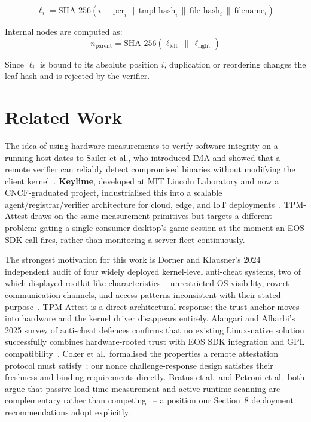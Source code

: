 \documentclass[11pt]{article}
\begin{document}
\begin{equation}
  \ell_i = \text{SHA-256}\!\left(i \,\|\, \text{pcr}_i \,\|\, \text{tmpl\_hash}_i \,\|\, \text{file\_hash}_i \,\|\, \text{filename}_i\right)
  \label{eq:leaf}
\end{equation}

Internal nodes are computed as:
\begin{equation}
  n_{\text{parent}} = \text{SHA-256}\!\left(\ell_{\text{left}} \,\|\, \ell_{\text{right}}\right)
  \label{eq:internal}
\end{equation}

Since $\ell_i$ is bound to its absolute position $i$, duplication or reordering changes the leaf hash and is rejected by the verifier.


\section{Related Work}
\label{sec:related-work}

The idea of using hardware measurements to verify software integrity on a running host dates to Sailer et al., who introduced IMA and showed that a remote verifier can reliably detect compromised binaries without modifying the client kernel~\cite{sailer2004ima}. \textbf{Keylime}, developed at MIT Lincoln Laboratory and now a CNCF-graduated project, industrialised this into a scalable agent/registrar/verifier architecture for cloud, edge, and IoT deployments~\cite{keylime}. TPM-Attest draws on the same measurement primitives but targets a different problem: gating a single consumer desktop's game session at the moment an EOS SDK call fires, rather than monitoring a server fleet continuously.

The strongest motivation for this work is Dorner and Klausner's 2024 independent audit of four widely deployed kernel-level anti-cheat systems, two of which displayed rootkit-like characteristics -- unrestricted OS visibility, covert communication channels, and access patterns inconsistent with their stated purpose~\cite{dorner2024rootkit}. TPM-Attest is a direct architectural response: the trust anchor moves into hardware and the kernel driver disappears entirely. Alangari and Alharbi's 2025 survey of anti-cheat defences confirms that no existing Linux-native solution successfully combines hardware-rooted trust with EOS SDK integration and GPL compatibility~\cite{alangari2025review}. Coker et al.\ formalised the properties a remote attestation protocol must satisfy~\cite{coker2011principles}; our nonce challenge-response design satisfies their freshness and binding requirements directly. Bratus et al.\ and Petroni et al.\ both argue that passive load-time measurement and active runtime scanning are complementary rather than competing~\cite{bratus2008,petroni2004} -- a position our Section~8 deployment recommendations adopt explicitly.
\end{document}
